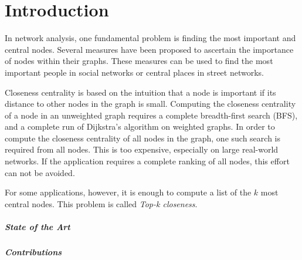 
\chapter{Introduction}
\label{ch:Introduction}

In network analysis, one fundamental problem is finding the most important and central nodes. Several measures have been proposed to ascertain the importance of nodes within their graphs. These measures can be used to find the most important people in social networks or central places in street networks.

Closeness centrality is based on the intuition that a node is important if its distance to other nodes in the graph is small. Computing the closeness centrality of a node in an unweighted graph requires a complete breadth-first search (BFS), and a complete run of Dijkstra's algorithm on weighted graphs. In order to compute the closeness centrality of all nodes in the graph, one such search is required from all nodes. This is too expensive, especially on large real-world networks. If the application requires a complete ranking of all nodes, this effort can not be avoided.

For some applications, however, it is enough to compute a list of the $k$ most central nodes. This problem is called \emph{Top-k closeness}.



\paragraph{State of the Art}

\paragraph{Contributions}
\


